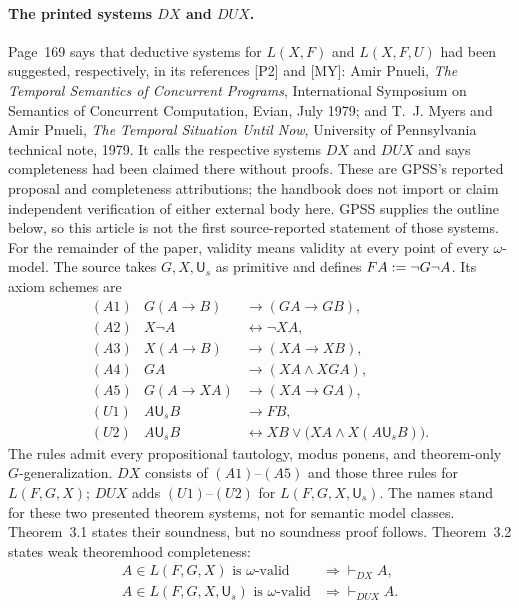 








\paragraph{The printed systems \(DX\) and \(DUX\).}
Page~169 says that deductive systems for \(L(X,F)\) and \(L(X,F,U)\) had been
suggested, respectively, in its references [P2] and [MY]: Amir Pnueli,
\emph{The Temporal Semantics of Concurrent Programs}, International Symposium
on Semantics of Concurrent Computation, Evian, July 1979; and T.~J. Myers and
Amir Pnueli, \emph{The Temporal Situation Until Now}, University of
Pennsylvania technical note, 1979.  It calls the respective systems \(DX\) and
\(DUX\) and says completeness had been claimed there without proofs.  These are
GPSS's reported proposal and completeness attributions; the handbook does not
import or claim independent verification of either external body here.  GPSS
supplies the outline below, so this article is not the first source-reported
statement of those systems.
For the remainder of the paper, validity means validity at every point of every
\(\omega\)-model.  The source takes \(G,X,\mathsf U_s\) as primitive and defines
\(FA\mathrel{:=}\neg G\neg A\).  Its axiom schemes are
\[
\begin{array}{rcl}
(A1)&G(A\to B)&\to(GA\to GB),\\
(A2)&X\neg A&\leftrightarrow\neg XA,\\
(A3)&X(A\to B)&\to(XA\to XB),\\
(A4)&GA&\to(XA\land XGA),\\
(A5)&G(A\to XA)&\to(XA\to GA),\\[2pt]
(U1)&A\mathbin{\mathsf U_s}B&\to FB,\\
(U2)&A\mathbin{\mathsf U_s}B
 &\leftrightarrow
 XB\lor\bigl(XA\land X(A\mathbin{\mathsf U_s}B)\bigr).
\end{array}
\]
The rules admit every propositional tautology, modus ponens, and theorem-only
\(G\)-generalization.  \(DX\) consists of \((A1)\)--\((A5)\) and those three
rules for \(L(F,G,X)\); \(DUX\) adds \((U1)\)--\((U2)\) for
\(L(F,G,X,\mathsf U_s)\).  The names stand for these two presented theorem systems,
not for semantic model classes.  Theorem~3.1 states their soundness, but no
soundness proof follows.  Theorem~3.2 states weak theoremhood completeness:
\[
\begin{aligned}
 A\in L(F,G,X)\text{ is \(\omega\)-valid}
   &\Longrightarrow \vdash_{DX}A,\\
 A\in L(F,G,X,\mathsf U_s)\text{ is \(\omega\)-valid}
   &\Longrightarrow \vdash_{DUX}A.
\end{aligned}
\]

